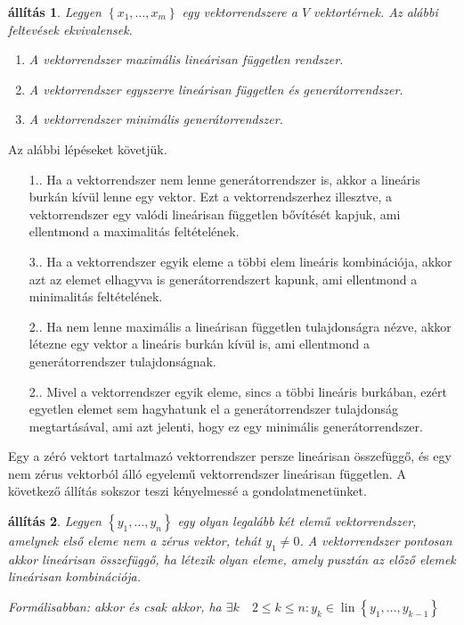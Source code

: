 \documentclass[9pt, a4paper, showtrims]{memoir}
\makeatletter
\renewenvironment{proof}[1][\proofname]
    {\par\pushQED{\qed}%
    \normalfont \topsep6\p@\@plus6\p@\relax
    \trivlist
    \item[\hskip\labelsep
        \itshape
    #1\@addpunct{:}]\ignorespaces}
    {\popQED\endtrivlist\@endpefalse}
\theoremstyle{plain}
\newtheorem{proposition}{állítás}[chapter]
\theoremstyle{remark}
\theoremstyle{definition}
\DeclareMathOperator{\lin}{lin}
\makeatother
\begin{document}
\begin{proposition}
    Legyen $\left\{ x_1,\dots,x_m \right\}$ egy vektorrendszere a $V$ vektortérnek.
    Az alábbi feltevések ekvivalensek.
    \begin{enumerate}
        \item A vektorrendszer maximális lineárisan független rendszer.
        \item A vektorrendszer egyszerre lineárisan független és generátorrendszer.
        \item A vektorrendszer minimális generátorrendszer.\qedhere
    \end{enumerate}
\end{proposition}
\begin{proof}
    Az alábbi lépéseket követjük.
    \begin{itemize}
        \item[1.\Rightarrow 2.]
            Ha a vektorrendszer nem lenne generátorrendszer is,
            akkor a lineáris burkán kívül lenne egy vektor.
            Ezt a vektorrendszerhez illesztve, a vektorrendszer egy valódi lineárisan független bővítését kapjuk,
            ami ellentmond a maximalitás feltételének.
        \item[3.\Rightarrow 2.]
            Ha a vektorrendszer egyik eleme a többi elem lineáris kombinációja,
            akkor azt az elemet elhagyva is generátorrendszert kapunk,
            ami ellentmond a minimalitás feltételének.
        \item[2.\Rightarrow 1.]
            Ha nem lenne maximális a lineárisan független tulajdonságra nézve,
            akkor létezne egy vektor a lineáris burkán kívül is,
            ami ellentmond a generátorrendszer tulajdonságnak.
        \item[2.\Rightarrow 3.]
            Mivel a vektorrendszer egyik eleme, sincs a többi lineáris burkában,
            ezért egyetlen elemet sem hagyhatunk el a generátorrendszer tulajdonság megtartásával,
            ami azt jelenti, hogy ez egy minimális generátorrendszer.\qedhere
    \end{itemize}
\end{proof}
Egy a zéró vektort tartalmazó vektorrendszer persze lineárisan összefüggő, 
és egy nem zérus vektorból álló egyelemű vektorrendszer lineárisan független.
A következő állítás sokszor teszi kényelmessé a gondolatmenetünket. 
\begin{proposition}
    Legyen $\left\{ y_1,\dots,y_n \right\}$ egy olyan legalább két elemű vektorrendszer,
    amelynek első eleme nem a zérus vektor, tehát $y_1\neq 0$.
    A vektorrendszer pontosan akkor lineárisan összefüggő,
    ha létezik olyan eleme, 
    amely pusztán az előző elemek lineárisan kombinációja.

    Formálisabban: akkor és csak akkor, 
    ha 
    $\exists k\quad 2\leq k\leq n : y_k\in\lin\left\{ y_1,\dots,y_{k-1} \right\}$
\end{proposition}
\end{document}
